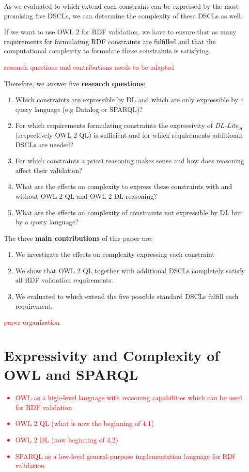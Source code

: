 \documentclass{llncs}
\begin{document}
As we evaluated to which extend each constraint can be expressed by the most promising five DSCLs, 
we can determine the complexity of these DSCLs as well. 

If we want to use OWL 2 for RDF validation, we have to ensure that as many requirements for formulating RDF constraints are fulfilled
and that the computational complexity to formulate these constraints is satisfying.  

\textcolor{red}{research questions and contributions needs to be adapted}

Therefore, we answer five \textbf{research questions}:
\begin{enumerate}
	\item Which constraints are expressible by DL and which are only expressible by a query language (e.g Datalog or SPARQL)?
	\item For which requirements formulating constraints the expressivity of \textit{DL-Lite}$_\mathcal{A}$ (respectively OWL 2 QL) is sufficient
	and for which requirements additional DSCLs are needed?
	\item For which constraints a priori reasoning makes sense and how does reasoning affect their validation?  
	\item What are the effects on complexity to express these constraints with and without OWL 2 QL and OWL 2 DL reasoning?
	\item What are the effects on complexity of constraints not expressible by DL but by a query language?
\end{enumerate}

The three \textbf{main contributions} of this paper are:
\begin{enumerate}
  \item We investigate the effects on complexity expressing each constraint
	\item We show that OWL 2 QL together with additional DSCLs completely satisfy all RDF validation requirements.
	\item We evaluated to which extend the five possible standard DSCLs fulfill each requirement.
\end{enumerate}

\textcolor{red}{paper organization}

\section{Expressivity and Complexity of OWL and SPARQL}

\textcolor{red}{
\begin{itemize}
	\item OWL as a high-level language with reasoning capabilities which can be used for RDF validation
  \item OWL 2 QL (what is now the beginning of 4.1)
  \item OWL 2 DL (now beginning of 4.2)
  \item SPARQL as a low-level general-purpose implementation language for RDf validation
\end{itemize}
}
\end{document}

